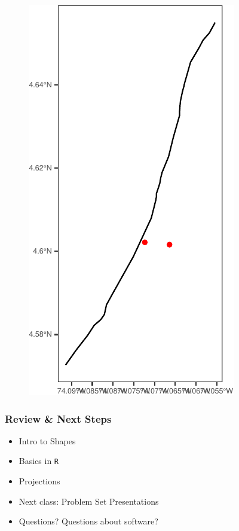 \documentclass[
  shownotes,
  xcolor={svgnames},
  hyperref={colorlinks,citecolor=DarkBlue,linkcolor=DarkRed,urlcolor=DarkBlue}
  ]{beamer}
\begin{document}
\begin{frame}[fragile]
\begin{minipage}[t]{0.43\linewidth}
\begin{figure}[H]
\includegraphics[scale=0.6]{figures/unnamed-chunk-7-1.pdf}

	\end{figure}
    \end{minipage}

\end{frame}




\begin{frame}
\frametitle{Review \& Next Steps}
  
  \begin{itemize} 
    \item Intro to Shapes
    \medskip
    \item Basics in \texttt{R}
    \medskip
    \item Projections
  	\bigskip  

	\item  Next class: Problem Set Presentations


\bigskip  
\item Questions? Questions about software? 

\end{itemize}
\end{frame}
\end{document}
